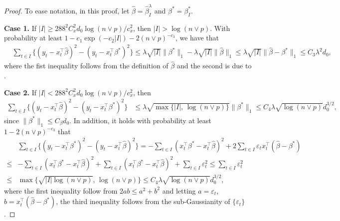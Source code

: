 \documentclass[twoside]{article}
\begin{document}
\begin{proof}
To ease notation, in this proof, let $\widehat{\beta} = \widehat{\beta}^\lambda_{I}$ and $\beta^* = \beta^*_I$. 

\vskip 3mm
\noindent \textbf{Case 1.}  If $|I| \geq 288^2 C^2_x d_0 \log(n \vee p)/c_x^2$, then $|I| > \log(n \vee p)$.  With probability at least $1 - c_1 \exp(-c_2 |I|) - 2(n \vee p)^{-c_3}$, we have that
	\begin{align*}
		& \sum_{t \in I} \bigl\{(y_t - x_t^{\top}\widehat{\beta})^2 - (y_t - x_t^{\top}\beta^*)^2\bigr\} \leq \lambda \sqrt{|I|} \|\beta^*\|_1 - \lambda \sqrt{|I|} \|\widehat{\beta}\|_1\leq \lambda \sqrt{|I|} \|\widehat{\beta} - \beta^*\|_1 \leq C_3 \lambda^2 d_0,
	\end{align*}
	where the fist inequality follows from the definition of $\widehat{\beta}$ and the second is due to .
		
\vskip 3mm
\noindent \textbf{Case 2.}  If $|I| < 288^2 C^2_x d_0 \log(n \vee p)/c_x^2$, then
	\begin{align*}
		\sum_{t \in I} \bigl\{(y_t - x_t^{\top}\widehat{\beta})^2 - (y_t - x_t^{\top}\beta^*)^2\bigr\}	 & \leq \lambda \sqrt{\max\{|I|, \, \log(n \vee p)\}}\|\beta^*\|_1 \leq C_4 \lambda \sqrt{\log(n \vee p)} d_0^{3/2},
	\end{align*}
	since $\|\beta^*\|_1 \leq C_{\beta}d_0$.  In addition, it holds with probability at least $1 - 2(n \vee p)^{-c_3}$ that
	\begin{align*}
		 & \sum_{t \in I} \bigl\{(y_t - x_t^{\top}\beta^*)^2 - (y_t - x_t^{\top}\widehat{\beta})^2\bigr\} = - \sum_{t \in I} (x_t^{\top} \beta^* - x_t^{\top} \widehat{\beta})^2 + 2\sum_{t \in I} \varepsilon_t x_t^{\top}(\widehat{\beta} - \beta^*) \\
		 \leq & - \sum_{t \in I} (x_t^{\top} \beta^* - x_t^{\top} \widehat{\beta})^2 + \sum_{t \in I} (x_t^{\top} \beta^* - x_t^{\top} \widehat{\beta})^2 + \sum_{t \in I} \varepsilon_t^2 \leq \sum_{t \in I} \varepsilon_t^2   \\
		 \leq & \max\{\sqrt{|I|\log(n \vee p)}, \, \log(n \vee p)\} \leq C_4 \lambda \sqrt{\log(n \vee p)} d_0^{3/2},
	\end{align*}
	where the first inequality follow from $2ab \leq a^2 + b^2$ and letting $a = \varepsilon_t$, $b = x_t^{\top}(\widehat{\beta} - \beta^*)$,  the third inequality follows from the sub-Gaussianity of $\{\varepsilon_t\}$.
\end{proof}
 
\end{document}
